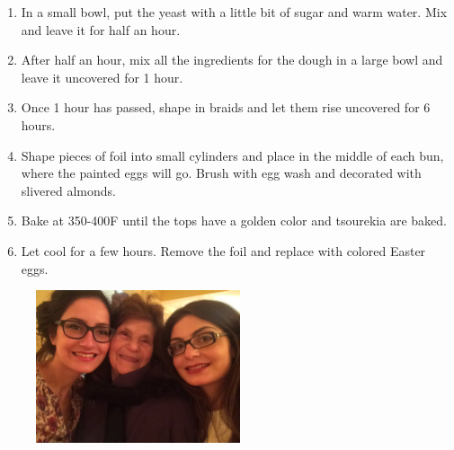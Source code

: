\begin{enumerate}
    \item  In a small bowl, put the yeast with a little bit of sugar and warm water. Mix and leave it for half an hour.
    \item  After half an hour, mix all the ingredients for the dough in a large bowl and leave it uncovered for 1 hour.
    \item  Once 1 hour has passed, shape in braids and let them rise uncovered for 6 hours.
    \item  Shape pieces of foil into small cylinders and place in the middle of each bun, where the painted eggs will go. Brush with egg wash and decorated with slivered almonds.
    \item  Bake at 350-400\degree F until the tops have a golden color and tsourekia are baked.
    \item  Let cool for a few hours. Remove the foil and replace with colored Easter eggs.
\end{enumerate}

\begin{figure}
  \includegraphics[width=60mm]{monanteras/images/Grandma eleni.JPG}
\end{figure}